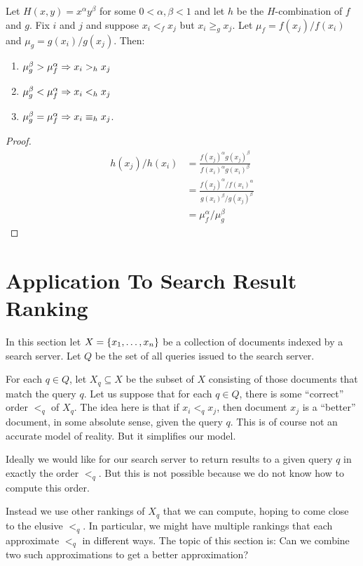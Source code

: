 \documentclass{article}
\begin{document}
\begin{lemma}
Let $H(x,y) = x^{\alpha}y^{\beta}$ for some $0<\alpha,\beta<1$ and let $h$ be
the $H$-combination of $f$ and $g$. Fix $i$ and $j$ and suppose $x_i <_f x_j$ but 
$x_i \geq_g x_j$. Let $\mu_f = f(x_j) /f(x_i)$ and $\mu_g = g(x_i) /g(x_j)$. Then:
\begin{enumerate}
\item $\mu_g^{\beta} > \mu_f^{\alpha} \Rightarrow x_i >_h x_j$
\item $\mu_g^{\beta} < \mu_f^{\alpha} \Rightarrow x_i <_h x_j$
\item $\mu_g ^{\beta}= \mu_f^{\alpha} \Rightarrow x_i \equiv_h x_j$.
\end{enumerate}
\end{lemma}

\begin{proof}
\begin{equation}
\begin{split}
h(x_j)/h(x_i) &= \frac{f(x_j)^{\alpha}g(x_j)^{\beta}}{f(x_i)^{\alpha}g(x_i)^{\beta}} \\
              &= \frac{f(x_j)^{\alpha}/f(x_i)^{\alpha}}{g(x_i)^{\beta}/g(x_j)^{\beta}} \\
              &= \mu_f^{\alpha} / \mu_g^{\beta}
\end{split}
\end{equation}
\end{proof}


\section{Application To Search Result Ranking}
In this section let $X = \left\{x_1,\dots,x_n\right\}$ be a collection of documents
indexed by a search server. Let $Q$ be the set of all queries issued to the
search server. 

For each $q\in Q$, let $X_q\subseteq X$
be the subset of $X$ consisting of those documents that
match the query $q$. Let us suppose that for each $q\in Q$, there is some
``correct'' order
$<_q$ of $X_q$. The idea here is that if $x_i<_q x_j$, then document $x_j$ is a
``better'' document, in some absolute sense, given the query $q$. This is of
course not an accurate model of reality. But it simplifies our model.

Ideally we would like for our search server to return results to a given query
$q$ in exactly the order $<_q$. But this is not possible because we do not know
how to compute this order.

Instead we use other rankings of $X_q$ that we can compute, hoping to come close
to the elusive $<_q$. In particular, we might have multiple rankings that each
approximate $<_q$ in different ways. The topic of this section is: Can we combine
two such approximations to get a better approximation?
\end{document}
